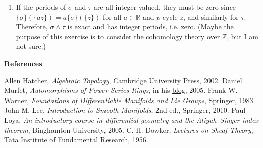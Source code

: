 \begin{enumerate}
Now set $g \in S^{p-1}(M, \mathbb{R})$ s.t. for $(p-1)$-boundary $\partial \tau$, 
$g(\partial \tau)=f(\tau)$ and otherwise $0$. 
It is well-defined since if $\partial \tau=\partial \tau^{\prime}$ then $\tau-\tau^{\prime}$ is a cycle, so $f(\tau-\tau^{\prime})=0$. 
Then $d g=f$, so $[f]=0$. Therefore $\varphi$ is injective.
By the way, if $g \in{ }_{\infty} H_{p}(M ; \mathbb{R})^{*}$, 
set $f \in S^{p}(M, \mathbb{R})$ s.t. $f(\sigma)=g([\sigma])$. 
Then it is well-defined, and $d f(\tau)=f(\partial \tau)=g([\partial \tau])=0$, so $f$ is a cocycle. 
Also, $\varphi(f)=g$ by the setting. Hence $\varphi$ is surjective.
\item If the periods of $\sigma$ and $\tau$ are all integer-valued, 
they must be zero since $\{\sigma\}(\{a z\})=a\{\sigma\}(\{z\})$ for all $a \in \mathbb{R}$ and $p$-cycle $z$, and similarly for $\tau$. 
Therefore, $\sigma \wedge \tau$ is exact and has integer periods, i.e. zero. 
(Maybe the purpose of this exercise is to consider the cohomology theory over $\mathbb{Z}$, but I am not sure.)
\end{enumerate}
\textbf{References}
\begin{references}
 Allen Hatcher, \textit{Algebraic Topology}, Cambridge University Press, 2002.
 Daniel Murfet, \textit{Automorphisms of Power Series Rings}, in his \href{http://therisingsea.org}{blog}, 2005.
 Frank W. Warner, \textit{Foundations of Differentiable Manifolds and Lie Groups}, Springer, 1983.
 John M. Lee, \textit{Introduction to Smooth Manifolds}, 2nd ed., Springer, 2010.
 Paul Loya, \textit{An introductory course in differential geometry and the Atiyah--Singer index theorem}, Binghamton University, 2005.
 C. H. Dowker, \textit{Lectures on Sheaf Theory}, Tata Institute of Fundamental Research, 1956.
\end{references}